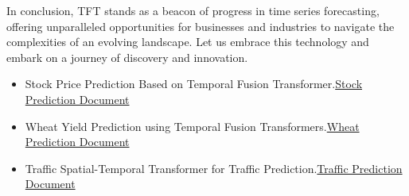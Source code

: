 \begin{frame}
In conclusion, TFT stands as a beacon of progress in time series forecasting, offering unparalleled opportunities for businesses and industries to navigate the complexities of an evolving landscape. Let us embrace this technology and embark on a journey of discovery and innovation.
\end{frame}

\begin{frame}
\begin{itemize}
	\item Stock Price Prediction Based on Temporal Fusion Transformer.\cite{Hu:2021}\href{https://ieeexplore.ieee.org/document/9731073}{Stock Prediction Document}
	\item Wheat Yield Prediction using Temporal Fusion Transformers.\cite{Junankar:2023}\href{https://ieeexplore.ieee.org/document/10101144}{Wheat Prediction Document}
	\item Traffic Spatial-Temporal Transformer for Traffic Prediction.\cite{He:2023}\href{https://ieeexplore.ieee.org/document/10271152}{Traffic Prediction Document}
\end{itemize}
\end{frame}

